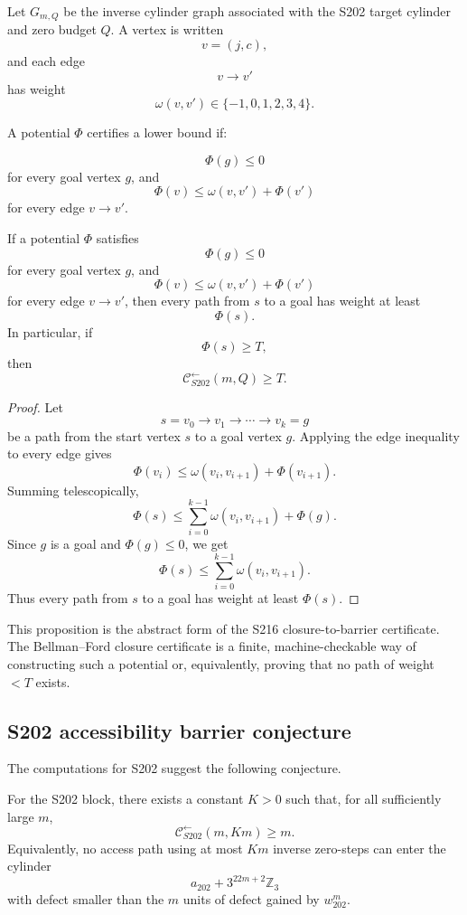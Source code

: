 Let \(G_{m,Q}\) be the inverse cylinder graph associated with the S202
target cylinder and zero budget \(Q\). A vertex is written
\[
v=(j,c),
\]
and each edge
\[
v\to v'
\]
has weight
\[
\omega(v,v')\in\{-1,0,1,2,3,4\}.
\]

A potential \(\Phi\) certifies a lower bound if:

\[
\Phi(g)\le0
\]
for every goal vertex \(g\), and
\[
\Phi(v)\le \omega(v,v')+\Phi(v')
\]
for every edge \(v\to v'\).

\begin{proposition}
\label{prop:dual-barrier-certificate}
If a potential \(\Phi\) satisfies
\[
\Phi(g)\le0
\]
for every goal vertex \(g\), and
\[
\Phi(v)\le \omega(v,v')+\Phi(v')
\]
for every edge \(v\to v'\), then every path from \(s\) to a goal has weight
at least
\[
\Phi(s).
\]
In particular, if
\[
\Phi(s)\ge T,
\]
then
\[
\mathcal C^{\leftarrow}_{S202}(m,Q)\ge T.
\]
\end{proposition}

\begin{proof}
Let
\[
s=v_0\to v_1\to\cdots\to v_k=g
\]
be a path from the start vertex \(s\) to a goal vertex \(g\). Applying the
edge inequality to every edge gives
\[
\Phi(v_i)
\le
\omega(v_i,v_{i+1})+\Phi(v_{i+1}).
\]
Summing telescopically,
\[
\Phi(s)
\le
\sum_{i=0}^{k-1}\omega(v_i,v_{i+1})+\Phi(g).
\]
Since \(g\) is a goal and \(\Phi(g)\le0\), we get
\[
\Phi(s)
\le
\sum_{i=0}^{k-1}\omega(v_i,v_{i+1}).
\]
Thus every path from \(s\) to a goal has weight at least \(\Phi(s)\).
\end{proof}

This proposition is the abstract form of the S216 closure-to-barrier
certificate. The Bellman--Ford closure certificate is a finite,
machine-checkable way of constructing such a potential or, equivalently,
proving that no path of weight \(<T\) exists.

\subsection{S202 accessibility barrier conjecture}
\label{subsec:S202-barrier-conjecture}

The computations for S202 suggest the following conjecture.

\begin{conjecture}
\label{conj:S202-accessibility-barrier}
For the S202 block, there exists a constant \(K>0\) such that, for all
sufficiently large \(m\),
\[
\mathcal C^{\leftarrow}_{S202}(m,Km)\ge m.
\]
Equivalently, no access path using at most \(Km\) inverse zero-steps can
enter the cylinder
\[
a_{202}+3^{22m+2}\mathbb Z_3
\]
with defect smaller than the \(m\) units of defect gained by
\(w_{202}^{m}\).
\end{conjecture}

